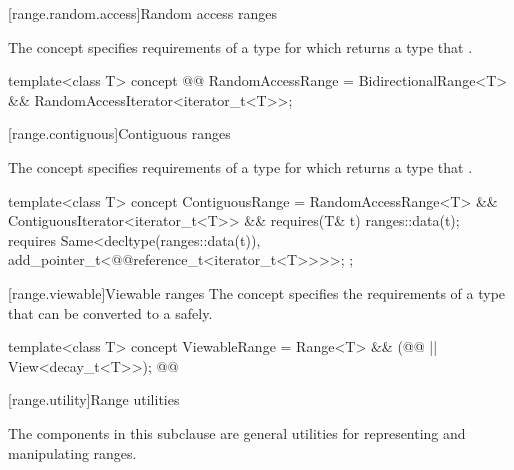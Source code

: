 {[range.random.access]{Random access ranges}

\pnum
The  concept specifies requirements of a
 type for which  returns a type that  
.

%
\begin{itemdecl}
template<class T>
concept @@ RandomAccessRange =
  BidirectionalRange<T> && RandomAccessIterator<iterator_t<T>>;
\end{itemdecl}

[range.contiguous]{Contiguous ranges}

\pnum
The  concept specifies requirements of a
 type for which  returns a type that  
.

%
\begin{itemdecl}
template<class T>
concept ContiguousRange =
  RandomAccessRange<T> && ContiguousIterator<iterator_t<T>> &&
  requires(T& t) {
    ranges::data(t);
    requires Same<decltype(ranges::data(t)), add_pointer_t<@@reference_t<iterator_t<T>>>>;
  };
\end{itemdecl}

[range.viewable]{Viewable ranges}
\pnum
The  concept specifies the requirements of a
 type that can be converted to a  safely.

%
\begin{itemdecl}
template<class T>
concept ViewableRange =
  Range<T> && (@@ || View<decay_t<T>>); @\oldtxt{// \seebelow}@
\end{itemdecl}

\begin{itemdescr}
\pnum
{}
\end{itemdescr}

[range.utility]{Range utilities}

\pnum
The components in this subclause are general utilities for representing and
manipulating ranges.

}
